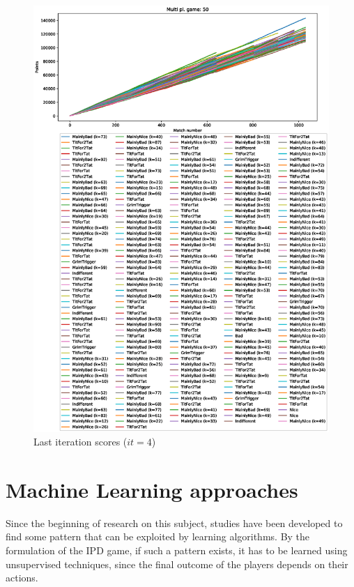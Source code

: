 \documentclass[journal,10pt,twoside]{IEEEtran}
\begin{document}
\begin{figure}[!ht]
    \centering
    \includegraphics[width=1\columnwidth]{../img/cipdmp-incr/alt1/cipdmp-scores-increasing-pop-50-r4}
    \caption{Last iteration scores ($it=4$)}
    \label{fig:incrCLI}
\end{figure}

\section{Machine Learning approaches} \label{s:ml}
Since the beginning of research on this subject, studies have been developed to find some pattern that can be exploited by learning algorithms.
By the formulation of the IPD game, if such a pattern exists, it has to be learned using unsupervised techniques, since the final outcome of the players depends on their actions.
\end{document}
